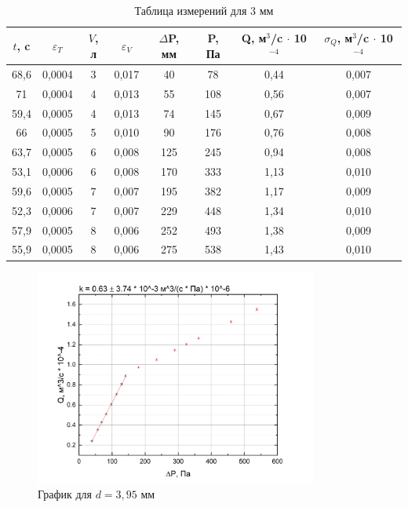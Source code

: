 \documentclass[a4paper, 12pt]{article}
\begin{document}
\begin{table}[!ht]
    \centering
    \begin{tabular}{|c|c|c|c|c|c|c|c|}
    \hline
        $t$, c & $\varepsilon_T$ & $V$, л & $\varepsilon_V$ & $\Delta$P, мм & P, Па & Q, м$^3$/c $\cdot$ 10$^{-4}$ & $\sigma_Q$, м$^3$/c $\cdot$ 10$^{-4}$ \\ \hline
        68,6 & 0,0004 & 3 & 0,017 & 40 & 78 & 0,44 & 0,007 \\ \hline
        71 & 0,0004 & 4 & 0,013 & 55 & 108 & 0,56 & 0,007 \\ \hline
        59,4 & 0,0005 & 4 & 0,013 & 74 & 145 & 0,67 & 0,009 \\ \hline
        66 & 0,0005 & 5 & 0,010 & 90 & 176 & 0,76 & 0,008 \\ \hline
        63,7 & 0,0005 & 6 & 0,008 & 125 & 245 & 0,94 & 0,008 \\ \hline
        53,1 & 0,0006 & 6 & 0,008 & 170 & 333 & 1,13 & 0,010 \\ \hline
        59,6 & 0,0005 & 7 & 0,007 & 195 & 382 & 1,17 & 0,009 \\ \hline
        52,3 & 0,0006 & 7 & 0,007 & 229 & 448 & 1,34 & 0,010 \\ \hline
        57,9 & 0,0005 & 8 & 0,006 & 252 & 493 & 1,38 & 0,009 \\ \hline
        55,9 & 0,0005 & 8 & 0,006 & 275 & 538 & 1,43 & 0,010 \\ \hline
    \end{tabular}
    \caption{Таблица измерений для $3$ мм }
\end{table}


\begin{figure}[!ht]
    \centering
    \includegraphics[width=0.83\textwidth]{G1.jpg}
    \caption{График для $d = 3,95$ мм}
\end{figure}
\end{document}
